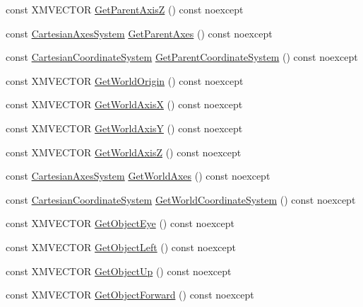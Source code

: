 \begin{DoxyCompactItemize}
\item 
const X\+M\+V\+E\+C\+T\+OR \hyperlink{structmage_1_1_transform_node_a65188d5be4f0bc4ff8bd822b659309cc}{Get\+Parent\+AxisZ} () const noexcept
\item 
const \hyperlink{structmage_1_1_cartesian_axes_system}{Cartesian\+Axes\+System} \hyperlink{structmage_1_1_transform_node_a65a2b2cef7a43dfce2e523f78d5eeb13}{Get\+Parent\+Axes} () const noexcept
\item 
const \hyperlink{structmage_1_1_cartesian_coordinate_system}{Cartesian\+Coordinate\+System} \hyperlink{structmage_1_1_transform_node_af99de109dd3e211fdc5f06a65ccc1e89}{Get\+Parent\+Coordinate\+System} () const noexcept
\item 
const X\+M\+V\+E\+C\+T\+OR \hyperlink{structmage_1_1_transform_node_a481e03769590d147bbdf7dedf56a6e65}{Get\+World\+Origin} () const noexcept
\item 
const X\+M\+V\+E\+C\+T\+OR \hyperlink{structmage_1_1_transform_node_a14a5604bcaa467c748f543092037ace6}{Get\+World\+AxisX} () const noexcept
\item 
const X\+M\+V\+E\+C\+T\+OR \hyperlink{structmage_1_1_transform_node_a94393cbc9a2a1270e2d52207233d6135}{Get\+World\+AxisY} () const noexcept
\item 
const X\+M\+V\+E\+C\+T\+OR \hyperlink{structmage_1_1_transform_node_a1e404dbe189d7fd326c4816d987759b6}{Get\+World\+AxisZ} () const noexcept
\item 
const \hyperlink{structmage_1_1_cartesian_axes_system}{Cartesian\+Axes\+System} \hyperlink{structmage_1_1_transform_node_aca4f35bb8aaffabc8c825133a7a307e9}{Get\+World\+Axes} () const noexcept
\item 
const \hyperlink{structmage_1_1_cartesian_coordinate_system}{Cartesian\+Coordinate\+System} \hyperlink{structmage_1_1_transform_node_a511e55c63c15d9e8958f33b298b6c103}{Get\+World\+Coordinate\+System} () const noexcept
\item 
const X\+M\+V\+E\+C\+T\+OR \hyperlink{structmage_1_1_transform_node_a627c3494fb3bd47551bbc48ad64369f5}{Get\+Object\+Eye} () const noexcept
\item 
const X\+M\+V\+E\+C\+T\+OR \hyperlink{structmage_1_1_transform_node_a674580a5f7f8926e5b1e9ce7ac312cb2}{Get\+Object\+Left} () const noexcept
\item 
const X\+M\+V\+E\+C\+T\+OR \hyperlink{structmage_1_1_transform_node_ab045712f4aa08651b2a43b1883e8c3fc}{Get\+Object\+Up} () const noexcept
\item 
const X\+M\+V\+E\+C\+T\+OR \hyperlink{structmage_1_1_transform_node_a4340e1f87d15589e3d763c0f124037bd}{Get\+Object\+Forward} () const noexcept

\end{DoxyCompactItemize}
